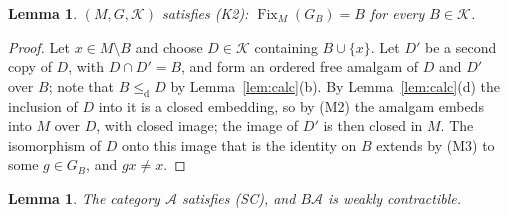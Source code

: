 \documentclass[11pt,a4paper]{article}
\newtheorem{lemma}[theorem]{Lemma}
\theoremstyle{definition}
\newcommand{\cle}{\leq_{\mathrm{d}}}
\newcommand{\Fix}{\operatorname{Fix}}
\newcommand{\K}{\mathcal{K}}
\begin{document}
\begin{lemma}\label{lem:K2delta}
$(M,G,\K)$ satisfies \textup{(K2)}: $\Fix_M(G_B)=B$ for every $B\in\K$.
\end{lemma}

\begin{proof}
Let $x\in M\setminus B$ and choose $D\in\K$ containing $B\cup\{x\}$. Let $D'$ be a
second copy of $D$, with $D\cap D'=B$, and form an ordered free amalgam of $D$
and $D'$ over $B$; note that $B\cle D$ by Lemma~\ref{lem:calc}(b). By
Lemma~\ref{lem:calc}(d) the inclusion of $D$ into it is a closed embedding, so
by (M2) the amalgam embeds into $M$ over $D$, with closed image; the image of
$D'$ is then closed in $M$. The isomorphism of $D$ onto this image that is the
identity on $B$ extends by (M3) to some $g\in G_B$, and $gx\ne x$.
\end{proof}

\begin{lemma}\label{lem:SCdelta}
The category $\mathcal A$ satisfies \textup{(SC)}, and $B\mathcal A$ is weakly
contractible.
\end{lemma}
\end{document}
